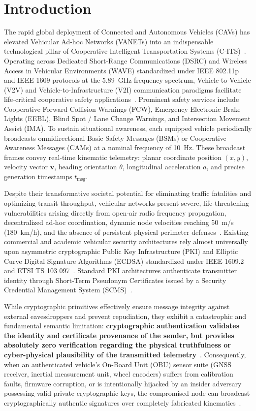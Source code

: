 \documentclass[conference]{IEEEtran}
\begin{document}
\section{Introduction}

The rapid global deployment of Connected and Autonomous Vehicles (CAVs) has elevated Vehicular Ad-hoc Networks (VANETs) into an indispensable technological pillar of Cooperative Intelligent Transportation Systems (C-ITS)~\cite{raya}. Operating across Dedicated Short-Range Communications (DSRC) and Wireless Access in Vehicular Environments (WAVE) standardized under IEEE 802.11p and IEEE 1609 protocols at the 5.89~GHz frequency spectrum, Vehicle-to-Vehicle (V2V) and Vehicle-to-Infrastructure (V2I) communication paradigms facilitate life-critical cooperative safety applications~\cite{vanetsecurity}. Prominent safety services include Cooperative Forward Collision Warnings (FCW), Emergency Electronic Brake Lights (EEBL), Blind Spot / Lane Change Warnings, and Intersection Movement Assist (IMA). To sustain situational awareness, each equipped vehicle periodically broadcasts omnidirectional Basic Safety Messages (BSMs) or Cooperative Awareness Messages (CAMs) at a nominal frequency of 10~Hz. These broadcast frames convey real-time kinematic telemetry: planar coordinate position $(x, y)$, velocity vector $\mathbf{v}$, heading orientation $\theta$, longitudinal acceleration $a$, and precise generation timestamps $t_{\text{msg}}$.

Despite their transformative societal potential for eliminating traffic fatalities and optimizing transit throughput, vehicular networks present severe, life-threatening vulnerabilities arising directly from open-air radio frequency propagation, decentralized ad-hoc coordination, dynamic node velocities reaching 50~m/s (180~km/h), and the absence of persistent physical perimeter defenses~\cite{trustsurvey, kargl2008secure}. Existing commercial and academic vehicular security architectures rely almost universally upon asymmetric cryptographic Public Key Infrastructure (PKI) and Elliptic Curve Digital Signature Algorithms (ECDSA) standardized under IEEE 1609.2~\cite{ieee16092} and ETSI TS 103 097~\cite{etsi103097}. Standard PKI architectures authenticate transmitter identity through Short-Term Pseudonym Certificates issued by a Security Credential Management System (SCMS)~\cite{whyte2013security}. 

While cryptographic primitives effectively ensure message integrity against external eavesdroppers and prevent repudiation, they exhibit a catastrophic and fundamental semantic limitation: \textbf{cryptographic authentication validates the identity and certificate provenance of the sender, but provides absolutely zero verification regarding the physical truthfulness or cyber-physical plausibility of the transmitted telemetry}~\cite{whyte2013security, veremi}. Consequently, when an authenticated vehicle's On-Board Unit (OBU) sensor suite (GNSS receiver, inertial measurement unit, wheel encoders) suffers from calibration faults, firmware corruption, or is intentionally hijacked by an insider adversary possessing valid private cryptographic keys, the compromised node can broadcast cryptographically authentic signatures over completely fabricated kinematics~\cite{veremi}.
\end{document}
